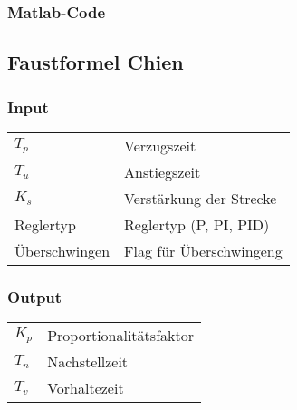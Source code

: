 \subsubsection*{Matlab-Code}


\subsection{Faustformel Chien}

\subsubsection*{Input}

\begin{tabular}{p{40mm}l}
    $ T_p $             & Verzugszeit \\
    $ T_u $             & Anstiegszeit \\
    $ K_s $             & Verst\"arkung der Strecke \\
      Reglertyp         & Reglertyp (P, PI, PID) \\
    \"Uberschwingen     & Flag f\"ur \"Uberschwingeng %
\end{tabular}

\subsubsection*{Output}
\begin{tabular}{p{40mm}l}
    $ K_p $ & Proportionalit\"atsfaktor \\
    $ T_n $ & Nachstellzeit \\
    $ T_v $ & Vorhaltezeit
\end{tabular}

